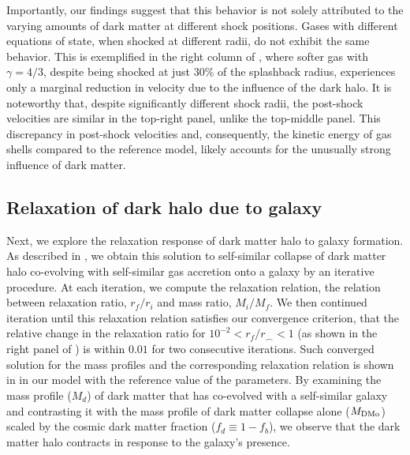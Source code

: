 Importantly, our findings suggest that this behavior is not solely attributed to the varying amounts of dark matter at different shock positions. Gases with different equations of state, when shocked at different radii, do not exhibit the same behavior. This is exemplified in the right column of , where softer gas with $\gamma=4/3$, despite being shocked at just $30\%$ of the splashback radius, experiences only a marginal reduction in velocity due to the influence of the dark halo. It is noteworthy that, despite significantly different shock radii, the post-shock velocities are similar in the top-right panel, unlike the top-middle panel. This discrepancy in post-shock velocities and, consequently, the kinetic energy of gas shells compared to the reference model, likely accounts for the unusually strong influence of dark matter.




\subsection{Relaxation of dark halo due to galaxy}
Next, we explore the relaxation response of dark matter halo to galaxy formation. As described in , we obtain this solution to self-similar collapse of dark matter halo co-evolving with self-similar gas accretion onto a galaxy by an iterative procedure. At each iteration, we compute the relaxation relation, the relation between relaxation ratio, $r_f/r_i$ and mass ratio, $M_i/M_f$. We then continued iteration until this relaxation relation satisfies our convergence criterion, that the relative change in the relaxation ratio for $10^{-2}<r_f/r_{\smallfrown}<1$ (as shown in the right panel of ) is within $0.01$ for two consecutive iterations. Such converged solution for the mass profiles and the corresponding relaxation relation is shown in  in our model with the reference value of the parameters. By examining the mass profile ($M_d$) of dark matter that has co-evolved with a self-similar galaxy and contrasting it with the mass profile of dark matter collapse alone ($M_{\rm DMo}$) scaled by the cosmic dark matter fraction ($f_d \equiv 1-f_b$), we observe that the dark matter halo contracts in response to the galaxy's presence. 


